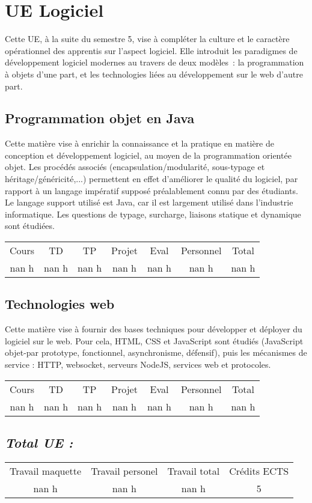 \section{UE Logiciel}%
\label{sec:UELogiciel}%
Cette UE, à la suite du semestre 5, vise à compléter la culture et le caractère opérationnel des apprentis sur l'aspect logiciel. Elle introduit les paradigmes de développement logiciel modernes au travers de deux modèles~: la programmation à objets d’une part, et les technologies liées au développement sur le web d’autre part.%
\subsection{Programmation objet en Java}%
\label{subsec:ProgrammationobjetenJava}%

%
Cette matière vise à enrichir la connaissance et la pratique en matière de conception et développement logiciel, au moyen de la programmation orientée objet. Les procédés associés (encapsulation/modularité, sous{-}typage et héritage/généricité,...) permettent en effet d'améliorer le qualité du logiciel, par rapport à un langage impératif supposé préalablement connu par des étudiants. Le langage support utilisé est Java, car il est largement utilisé dans l'industrie informatique. Les questions de typage, surcharge, liaisons statique et dynamique sont étudiées.%
\begin{longtable}{c c c c c c c}%
\hline%
Cours&TD&TP&Projet&Eval&Personnel&Total\\%
nan h&nan h&nan h&nan h&nan h&nan h&nan h\\%
\hline%
\end{longtable}%
\subsection{Technologies web}%
\label{subsec:Technologiesweb}%

%
Cette matière vise à fournir des bases techniques pour développer et déployer du logiciel sur le web. Pour cela, HTML, CSS et JavaScript sont étudiés (JavaScript objet{-}par prototype, fonctionnel, asynchronisme, défensif), puis les mécanismes de service : HTTP, websocket, serveurs NodeJS, services web et protocoles.  %
\begin{longtable}{c c c c c c c}%
\hline%
Cours&TD&TP&Projet&Eval&Personnel&Total\\%
nan h&nan h&nan h&nan h&nan h&nan h&nan h\\%
\hline%
\end{longtable}%
\subsection{\textit{Total UE :}}%
\label{subsec:textitTotalUE}%

%
\begin{longtable}{c c c c}%
\hline%
Travail maquette&Travail personel&Travail total&Crédits ECTS\\%
nan h&nan h&nan h&5\\%
\hline%
\end{longtable}